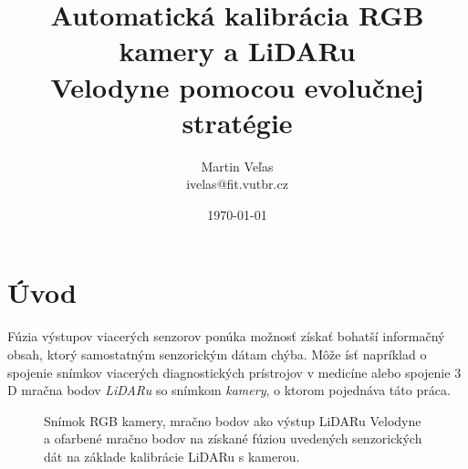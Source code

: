 \documentclass[12pt, a4paper]{article}
\title{Automatická kalibrácia RGB kamery a LiDARu\\Velodyne pomocou evolučnej stratégie}
\author{Martin Veľas\\ivelas@fit.vutbr.cz}
\date{\today}
\begin{document}
\maketitle

\section{Úvod}

Fúzia výstupov viacerých senzorov ponúka možnosť získať bohatší informačný obsah, ktorý samostatným senzorickým dátam chýba. Môže ísť napríklad o spojenie snímkov viacerých diagnostických prístrojov v medicíne\cite{jan} alebo spojenie $3$D mračna bodov \emph{LiDARu} so snímkom \emph{kamery}, o ktorom pojednáva táto práca.

\begin{figure}[h!]
	\center
	\quad
	\quad
\caption{Snímok RGB kamery, mračno bodov ako výstup LiDARu Velodyne a ofarbené mračno bodov na získané fúziou uvedených senzorických dát na základe kalibrácie LiDARu s kamerou.\cite{taylor}\label{fig:color-cloud}}
\end{figure}
\end{document}
